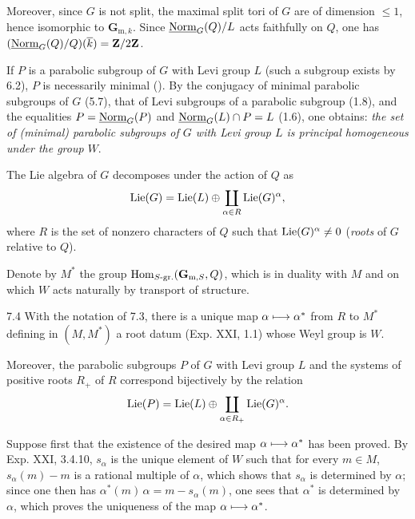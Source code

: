 Moreover, since $G$ is not split, the maximal split tori of $G$ are of dimension $\leq1$, hence isomorphic to $\mathbf G_{\mathrm m,k}$. Since $\underline{\mathrm{Norm}}_G(Q)/L$ acts faithfully on $Q$, one has $(\underline{\mathrm{Norm}}_G(Q)/Q)(\overline k)=\mathbf{Z}/2\mathbf{Z}$.

\label{XXVI.7.2}
If $P$ is a parabolic subgroup of $G$ with Levi group $L$ (such a subgroup exists by 6.2), $P$ is necessarily minimal (). By the conjugacy of minimal parabolic subgroups of $G$ (5.7), that of Levi subgroups of a parabolic subgroup (1.8), and the equalities $P=\underline{\mathrm{Norm}}_G(P)$ and $\underline{\mathrm{Norm}}_G(L)\cap P=L$ (1.6), one obtains: \emph{the set of (minimal) parabolic subgroups of $G$ with Levi group $L$ is principal homogeneous under the group $W$}.

\label{XXVI.7.3}
The Lie algebra of $G$ decomposes under the action of $Q$ as
\[
 \operatorname{Lie}(G)=\operatorname{Lie}(L)\oplus\coprod_{\alpha\in R}\operatorname{Lie}(G)^\alpha,
\]
where $R$ is the set of nonzero characters of $Q$ such that $\operatorname{Lie}(G)^\alpha\neq0$ (\emph{roots} of $G$ relative to $Q$).

Denote by $M^*$ the group $\operatorname{Hom}_{S\text{-gr.}}(\mathbf G_{\mathrm m,S},Q)$, which is in duality with $M$ and on which $W$ acts naturally by transport of structure.

\begin{theorem}{7.4}\label{XXVI.7.4}
With the notation of 7.3, there is a unique map $\alpha\longmapsto\alpha^*$ from $R$ to $M^*$ defining in $(M,M^*)$ a root datum (Exp. XXI, 1.1) whose Weyl group is $W$.

Moreover, the parabolic subgroups $P$ of $G$ with Levi group $L$ and the systems of positive roots $R_+$ of $R$ correspond bijectively by the relation
\[
 \operatorname{Lie}(P)=\operatorname{Lie}(L)\oplus\coprod_{\alpha\in R_+}\operatorname{Lie}(G)^\alpha.
\]
\end{theorem}

\label{XXVI.7.4.1}
Suppose first that the existence of the desired map $\alpha\longmapsto\alpha^*$ has been proved. By Exp. XXI, 3.4.10, $s_\alpha$ is the unique element of $W$ such that for every $m\in M$, $s_\alpha(m)-m$ is a rational multiple of $\alpha$, which shows that $s_\alpha$ is determined by $\alpha$; since one then has $\alpha^*(m)\,\alpha=m-s_\alpha(m)$, one sees that $\alpha^*$ is determined by $\alpha$, which proves the uniqueness of the map $\alpha\longmapsto\alpha^*$.

